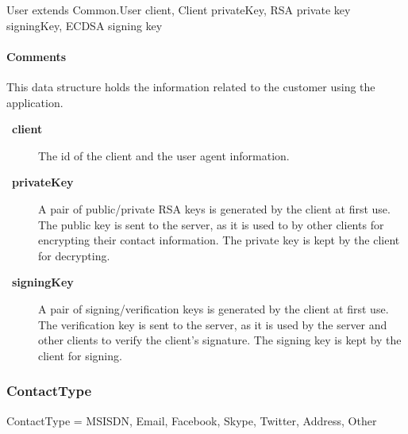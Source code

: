 \documentclass[a4paper,10pt]{article}
\let\Item\item
\newcommand\SpecialItem{\renewcommand\item[1][]{\Item[\textbullet~\bfseries##1]}
}
\begin{document}
\begin{verbbox}
User extends Common.User
{
  client, Client
  privateKey, RSA private key
  signingKey, ECDSA signing key
}
\end{verbbox}
\begin{center}
\theverbbox
\end{center}

\begin{inparaitem}[ ]
 \item \unique
 \item \secure
 \item \persistent
\end{inparaitem}

\paragraph*{Comments}
This data structure holds the information related to the customer using the application.

\SpecialItem
\begin{description}
 \item[client] The id of the client and the user agent information.
 \item[privateKey] A pair of public/private RSA keys is generated by the client at first use. The public key is sent to the server, as it is used to by other clients for 
encrypting their contact information. The private key is kept by the client for decrypting.
 \item[signingKey] A pair of signing/verification keys is generated by the client at first use. The verification key is sent to the server, as it is used by the server and other 
clients to verify the client's signature. The signing key is kept by the client for signing.
\end{description}

\subsubsection{ContactType}
\begin{verbbox}
ContactType = { MSISDN, Email, Facebook, Skype, Twitter, Address,
                Other }
\end{verbbox}
\begin{center}
\theverbbox
\end{center}

\begin{inparaitem}[ ]
 \item \infrastructure
\end{inparaitem}
\end{document}
